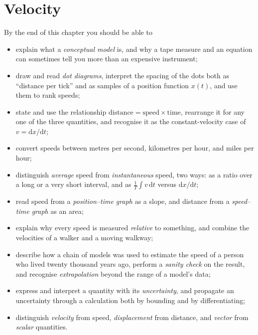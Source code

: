 \documentclass[11pt,twoside,openany]{book}
\newcommand{\dd}{\mathrm{d}}
\newcounter{check}[chapter]
\begin{document}
\setcounter{chapter}{0}

\chapter{Velocity}

\begin{tcolorbox}[enhanced,colback=white,colframe=teal,sharp corners,boxrule=1pt,
  title=\textbf{In this chapter},coltitle=white,colbacktitle=teal,left=3mm,right=3mm]
By the end of this chapter you should be able to
\begin{itemize}[itemsep=2pt,topsep=2pt]
  \item explain what a \emph{conceptual model} is, and why a tape measure and an equation can sometimes tell you more than an expensive instrument;
  \item draw and read \emph{dot diagrams}, interpret the spacing of the dots both as ``distance per tick'' and as samples of a position function $x(t)$, and use them to rank speeds;
  \item state and use the relationship $\text{distance} = \text{speed} \times \text{time}$, rearrange it for any one of the three quantities, and recognise it as the constant-velocity case of $v = \dd x/\dd t$;
  \item convert speeds between metres per second, kilometres per hour, and miles per hour;
  \item distinguish \emph{average} speed from \emph{instantaneous} speed, two ways: as a ratio over a long or a very short interval, and as $\frac{1}{T}\int v\,\dd t$ versus $\dd x/\dd t$;
  \item read speed from a \emph{position--time graph} as a slope, and distance from a \emph{speed--time graph} as an area;
  \item explain why every speed is measured \emph{relative} to something, and combine the velocities of a walker and a moving walkway;
  \item describe how a chain of models was used to estimate the speed of a person who lived twenty thousand years ago, perform a \emph{sanity check} on the result, and recognise \emph{extrapolation} beyond the range of a model's data;
  \item express and interpret a quantity with its \emph{uncertainty}, and propagate an uncertainty through a calculation both by bounding and by differentiating;
  \item distinguish \emph{velocity} from speed, \emph{displacement} from distance, and \emph{vector} from \emph{scalar} quantities.
\end{itemize}
\end{tcolorbox}
\end{document}
